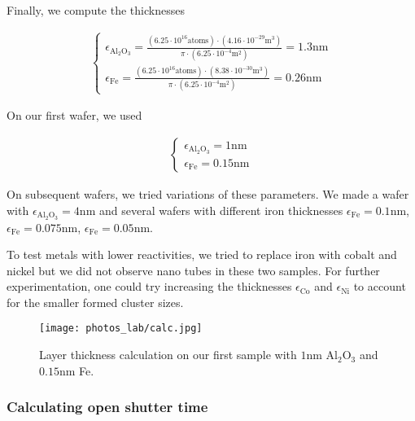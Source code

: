 \documentclass[a4paper,12pt,twoside]{article}
\begin{document}
Finally, we compute the thicknesses

\begin{align}
        \begin{cases}
            \epsilon_{\mathrm{Al_2O_3}} =  \frac{ (6.25 \cdot 10^{16} \mathrm{atoms}) \cdot (4.16 \cdot 10^{-29} \mathrm{m^3})}{\pi \cdot (6.25 \cdot 10^{-4} \mathrm{m}^2)} = 1.3 \mathrm{nm}\\
            \epsilon_{\mathrm{Fe}} = \frac{ (6.25 \cdot 10^{16} \mathrm{atoms}) \cdot (8.38 \cdot 10^{-30} \mathrm{m^3})}{\pi \cdot (6.25 \cdot 10^{-4} \mathrm{m}^2)} = 0.26 \mathrm{nm}
        \end{cases}
    \end{align}

\begin{tcolorbox}
    On our first wafer, we used
    
    \begin{align}
        \begin{cases}
            \epsilon_{\mathrm{Al_2O_3}} =  1 \mathrm{nm}\\
            \epsilon_{\mathrm{Fe}} = 0.15 \mathrm{nm}
        \end{cases}
    \end{align}
    
    On subsequent wafers, we tried variations of these parameters. We made a wafer with $\epsilon_{\mathrm{Al_2O_3}} = 4\mathrm{nm}$ and several wafers with different iron thicknesses $\epsilon_{\mathrm{Fe}} = 0.1 \mathrm{nm}$, $\epsilon_{\mathrm{Fe}} = 0.075 \mathrm{nm}$, $\epsilon_{\mathrm{Fe}} = 0.05 \mathrm{nm}$.
    
    To test metals with lower reactivities, we tried to replace iron with cobalt and nickel but we did not observe nano tubes in these two samples. For further experimentation, one could try increasing the thicknesses $\epsilon_{\mathrm{Co}}$ and $\epsilon_{\mathrm{Ni}}$ to account for the smaller formed cluster sizes.
\end{tcolorbox}

\begin{figure}[H]
    \centering
    \texttt{[image: photos\_lab/calc.jpg]}
    \caption{Layer thickness calculation on our first sample with $1\mathrm{nm}$ Al$_2$O$_3$ and $0.15\mathrm{nm}$ Fe.}
    \label{fig:calc}
\end{figure}

\subsubsection{Calculating open shutter time}
\end{document}
